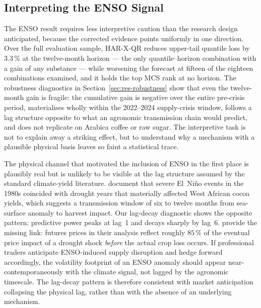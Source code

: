 \subsection{Interpreting the ENSO Signal}
\label{sec:disc-rq2}

The ENSO result requires less interpretive caution than the research design
anticipated, because the corrected evidence points uniformly in one
direction. Over the full evaluation sample, HAR-X-QR reduces upper-tail
quantile loss by $3.3\,\%$ at the twelve-month horizon --- the only
quantile--horizon combination with a gain of any substance --- while
worsening the forecast at fifteen of the eighteen combinations examined,
and it holds the top MCS rank at no horizon. The robustness diagnostics
in Section~\ref{sec:res-robustness} show that even the twelve-month gain
is fragile: the cumulative gain is negative over the entire pre-crisis
period, materialises wholly within the 2022--2024 supply-crisis window,
follows a lag structure opposite to what an agronomic transmission chain
would predict, and does not replicate on Arabica coffee or raw sugar. The
interpretive task is not to explain away a striking effect, but to
understand why a mechanism with a plausible physical basis leaves so
faint a statistical trace.

The physical channel that motivated the inclusion of ENSO in the first place
is plausibly real but is unlikely to be visible at the lag structure assumed
by the standard climate-yield literature. \textcite{schrothVulnerabilityClimateChange2016}
document that severe El~Ni\~no events in the 1980s coincided with drought
years that materially affected West African cocoa yields, which suggests a
transmission window of six to twelve months from sea-surface anomaly to
harvest impact. Our lag-decay diagnostic shows the opposite pattern:
predictive power peaks at lag~1 and decays sharply by lag~6.
\textcite{berganderDeepLearningCocoa2025} provide the missing link: futures
prices in their analysis reflect roughly $85\,\%$ of the eventual price
impact of a drought shock \emph{before} the actual crop loss occurs. If
professional traders anticipate ENSO-induced supply disruption and hedge
forward accordingly, the volatility footprint of an ENSO anomaly should
appear near-contemporaneously with the climate signal, not lagged by the
agronomic timescale. The lag-decay pattern is therefore consistent with
market anticipation collapsing the physical lag, rather than with the
absence of an underlying mechanism.

